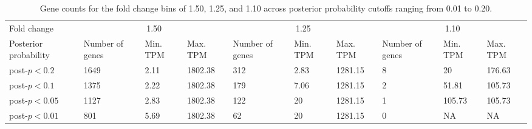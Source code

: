 \begin{landscape}
\begin{table}[h!]
\centering
\caption{Gene counts for the fold change bins of 1.50, 1.25, and 1.10 across posterior probability cutoffs ranging from 0.01 to 0.20.}
\label{tab:c2t1}
\small
\begin{tabular}{|p{2.2cm}|p{1.25cm}|p{1.25cm}|p{1.25cm}|p{1.25cm}|p{1.25cm}|p{1.25cm}|p{1.25cm}|p{1.25cm}|p{1.25cm}|}
\hline
Fold change & \multicolumn{3}{c|}{1.50}                   & \multicolumn{3}{c|}{1.25}                   & \multicolumn{3}{c|}{1.10}                   \\ \cline{1-10} 
Posterior probability                             & Number of genes & Min. TPM & Max. TPM & Number of genes & Min. TPM & Max. TPM & Number of genes & Min. TPM & Max. TPM \\ \hline
post-$p < 0.2$        & 1649            & 2.11        & 1802.38     & 312             & 2.83        & 1281.15     & 8               & 20          & 176.63      \\ \hline
post-$p < 0.1$         & 1375            & 2.22        & 1802.38     & 179             & 7.06        & 1281.15     & 2               & 51.81       & 105.73      \\ \hline
post-$p < 0.05$       & 1127            & 2.83        & 1802.38     & 122             & 20          & 1281.15     & 1               & 105.73      & 105.73      \\ \hline
post-$p < 0.01$        & 801             & 5.69        & 1802.38     & 62              & 20          & 1281.15     & 0               & NA          & NA          \\ \hline
\end{tabular}
\end{table}
\end{landscape}



